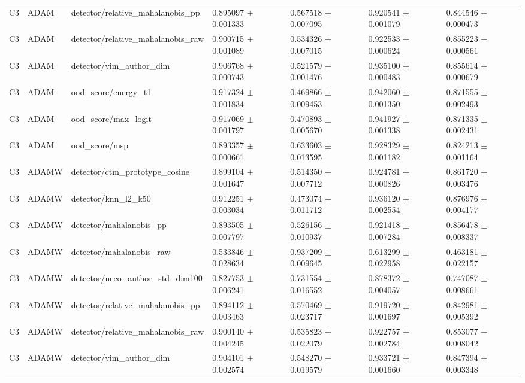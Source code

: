 \begin{longtable}{lllllll}
C3 & ADAM & detector/relative\_mahalanobis\_pp & 0.895097 $\pm$ 0.001333 & 0.567518 $\pm$ 0.007095 & 0.920541 $\pm$ 0.001079 & 0.844546 $\pm$ 0.000473 \\
C3 & ADAM & detector/relative\_mahalanobis\_raw & 0.900715 $\pm$ 0.001089 & 0.534326 $\pm$ 0.007015 & 0.922533 $\pm$ 0.000624 & 0.855223 $\pm$ 0.000561 \\
C3 & ADAM & detector/vim\_author\_dim & 0.906768 $\pm$ 0.000743 & 0.521579 $\pm$ 0.001476 & 0.935100 $\pm$ 0.000483 & 0.855614 $\pm$ 0.000679 \\
C3 & ADAM & ood\_score/energy\_t1 & 0.917324 $\pm$ 0.001834 & 0.469866 $\pm$ 0.009453 & 0.942060 $\pm$ 0.001350 & 0.871555 $\pm$ 0.002493 \\
C3 & ADAM & ood\_score/max\_logit & 0.917069 $\pm$ 0.001797 & 0.470893 $\pm$ 0.005670 & 0.941927 $\pm$ 0.001338 & 0.871335 $\pm$ 0.002431 \\
C3 & ADAM & ood\_score/msp & 0.893357 $\pm$ 0.000661 & 0.633603 $\pm$ 0.013595 & 0.928329 $\pm$ 0.001182 & 0.824213 $\pm$ 0.001164 \\
C3 & ADAMW & detector/ctm\_prototype\_cosine & 0.899104 $\pm$ 0.001647 & 0.514350 $\pm$ 0.007712 & 0.924781 $\pm$ 0.000826 & 0.861720 $\pm$ 0.003476 \\
C3 & ADAMW & detector/knn\_l2\_k50 & 0.912251 $\pm$ 0.003034 & 0.473074 $\pm$ 0.011712 & 0.936120 $\pm$ 0.002554 & 0.876976 $\pm$ 0.004177 \\
C3 & ADAMW & detector/mahalanobis\_pp & 0.893505 $\pm$ 0.007797 & 0.526156 $\pm$ 0.010937 & 0.921418 $\pm$ 0.007284 & 0.856478 $\pm$ 0.008337 \\
C3 & ADAMW & detector/mahalanobis\_raw & 0.533846 $\pm$ 0.028634 & 0.937209 $\pm$ 0.009645 & 0.613299 $\pm$ 0.022958 & 0.463181 $\pm$ 0.022157 \\
C3 & ADAMW & detector/neco\_author\_std\_dim100 & 0.827753 $\pm$ 0.006241 & 0.731554 $\pm$ 0.016552 & 0.878372 $\pm$ 0.004057 & 0.747087 $\pm$ 0.008661 \\
C3 & ADAMW & detector/relative\_mahalanobis\_pp & 0.894112 $\pm$ 0.003463 & 0.570469 $\pm$ 0.023717 & 0.919720 $\pm$ 0.001697 & 0.842981 $\pm$ 0.005392 \\
C3 & ADAMW & detector/relative\_mahalanobis\_raw & 0.900140 $\pm$ 0.004245 & 0.535823 $\pm$ 0.022079 & 0.922757 $\pm$ 0.002784 & 0.853077 $\pm$ 0.008042 \\
C3 & ADAMW & detector/vim\_author\_dim & 0.904101 $\pm$ 0.002574 & 0.548270 $\pm$ 0.019579 & 0.933721 $\pm$ 0.001660 & 0.847394 $\pm$ 0.003348 \\

\end{longtable}
